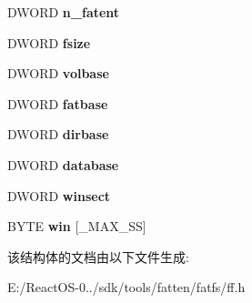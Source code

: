 \begin{DoxyCompactItemize}
\item 
\mbox{\label{struct_f_a_t_f_s_a8da50eeba6469bc20d60ca0cf9a1307c}} 
D\+W\+O\+RD {\bfseries n\+\_\+fatent}
\item 
\mbox{\label{struct_f_a_t_f_s_a53e9560659f14e66f306c2c444198bf3}} 
D\+W\+O\+RD {\bfseries fsize}
\item 
\mbox{\label{struct_f_a_t_f_s_a8f0ca578755749d204f59dc83f1a7649}} 
D\+W\+O\+RD {\bfseries volbase}
\item 
\mbox{\label{struct_f_a_t_f_s_a848fba02c4aabe02ef2984e578f33d64}} 
D\+W\+O\+RD {\bfseries fatbase}
\item 
\mbox{\label{struct_f_a_t_f_s_a3f72fd998dbcce4652a85a81fe944bc4}} 
D\+W\+O\+RD {\bfseries dirbase}
\item 
\mbox{\label{struct_f_a_t_f_s_a5b6c0bc2e9fd2ae8ef714210a74a2d5d}} 
D\+W\+O\+RD {\bfseries database}
\item 
\mbox{\label{struct_f_a_t_f_s_ac60e69c00e6bf7c25febfbac4dc1476b}} 
D\+W\+O\+RD {\bfseries winsect}
\item 
\mbox{\label{struct_f_a_t_f_s_a7cc35a593465e727ab87723c14610644}} 
B\+Y\+TE {\bfseries win} \mbox{[}\+\_\+\+M\+A\+X\+\_\+\+SS\mbox{]}
\end{DoxyCompactItemize}


该结构体的文档由以下文件生成\+:\begin{DoxyCompactItemize}
\item 
E\+:/\+React\+O\+S-\/0../sdk/tools/fatten/fatfs/ff.\+h\end{DoxyCompactItemize}
